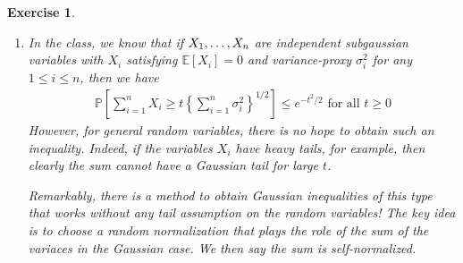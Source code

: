 \documentclass[12pt]{article}
\theoremstyle{colon}
\newtheorem{exercise}{Exercise}
\begin{document}
\begin{exercise}
  \begin{enumerate}[label=\arabic*)]
    \item In the class, we know that if $X_1, \mathellipsis, X_n$ are independent subgaussian variables with $X_i$ satisfying $\mathbb{E}[X_i] = 0$ and variance-proxy $\sigma_i^2$ for any $1 \leq i \leq n$, then we have
      \begin{gather*}
        \mathbb{P} \left[ \sum_{i=1}^n X_i \geq t \left\{ \sum_{i=1}^n \sigma_i^2 \right\}^{1/2} \right] \leq e^{-t^2/2} \text{ for all } t \geq 0
      \end{gather*}
      However, for general random variables, there is no hope to obtain such an inequality. Indeed, if the variables $X_i$ have heavy tails, for example, then clearly the sum cannot have a Gaussian tail for large $t$.

      Remarkably, there is a method to obtain Gaussian inequalities of this type that works without any tail assumption on the random variables! The key idea is to choose a random normalization that plays the role of the sum of the variaces in the Gaussian case. We then say the sum is self-normalized.


\end{enumerate}
\end{exercise}
\end{document}
